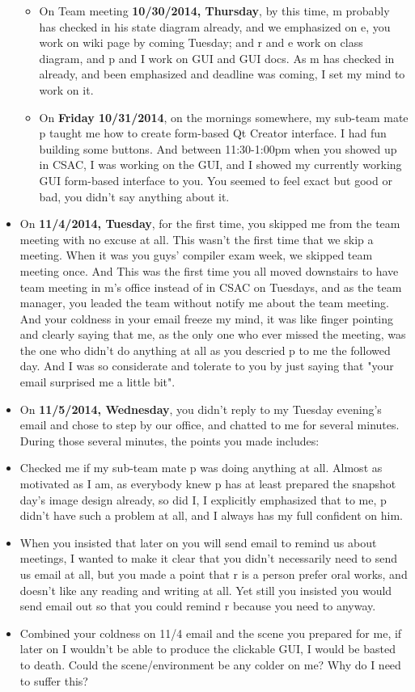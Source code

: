 \documentclass[9pt,b5paper]{article}
\begin{document}
\begin{itemize}
\begin{itemize}
\item On Team meeting \textbf{10/30/2014, Thursday}, by this time, m probably has checked in his state diagram already, and we emphasized on e, you work on wiki page by coming Tuesday; and r and e work on class diagram, and p and I work on GUI and GUI docs. As m has checked in already, and been emphasized and deadline was coming, I set my mind to work on it.

\item On \textbf{Friday 10/31/2014}, on the mornings somewhere, my sub-team mate p taught me how to create form-based Qt Creator interface. I had fun building some buttons. And between 11:30-1:00pm when you showed up in CSAC, I was working on the GUI, and I showed my currently working GUI form-based interface to you. You seemed to feel exact but good or bad, you didn't say anything about it.
\end{itemize}

\item On \textbf{11/4/2014, Tuesday}, for the first time, you skipped me from the team meeting with no excuse at all. This wasn't the first time that we skip a meeting. When it was you guys' compiler exam week, we skipped team meeting once. And This was the first time you all moved downstairs to have team meeting in m's office instead of in CSAC on Tuesdays, and as the team manager, you leaded the team without notify me about the team meeting. And your coldness in your email freeze my mind, it was like finger pointing and clearly saying that me, as the only one who ever missed the meeting, was the one who didn't do anything at all as you descried p to me the followed day. And I was so considerate and tolerate to you by just saying that "your email surprised me a little bit".

\item On \textbf{11/5/2014, Wednesday}, you didn't reply to my Tuesday evening's email and chose to step by our office, and chatted to me for several minutes. During those several minutes, the points you made includes:
\item Checked me if my sub-team mate p was doing anything at all. Almost as motivated as I am, as everybody knew p has at least prepared the snapshot day's image design already, so did I, I explicitly emphasized that to me, p didn't have such a problem at all, and I always has my full confident on him.
\item When you insisted that later on you will send email to remind us about meetings, I wanted to make it clear that you didn't necessarily need to send us email at all, but you made a point that r is a person prefer oral works, and doesn't like any reading and writing at all. Yet still you insisted you would send email out so that you could remind r because you need to anyway.
\item Combined your coldness on 11/4 email and the scene you prepared for me, if later on I wouldn't be able to produce the clickable GUI, I would be basted to death. Could the scene/environment be any colder on me? Why do I need to suffer this?


\end{itemize}
\end{document}

